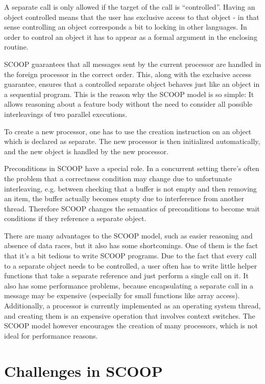 \documentclass[a4paper,10pt]{article}
\begin{document}
A separate call is only allowed if the target of the call is ``controlled''.
Having an object controlled means that the user has exclusive access to that object - in that sense controlling an object corresponds a bit to locking in other languages.
In order to control an object it has to appear as a formal argument in the enclosing routine.

SCOOP guarantees that all messages sent by the current processor are handled in the foreign processor in the correct order.
This, along with the exclusive access guarantee, ensures that a controlled separate object behaves just like an object in a sequential program.
This is the reason why the SCOOP model is so simple: 
It allows reasoning about a feature body without the need to consider all possible interleavings of two parallel executions.

To create a new processor, one has to use the creation instruction on an object which is declared as separate.
The new processor is then initialized automatically, and the new object is handled by the new processor.

Preconditions in SCOOP have a special role.
In a concurrent setting there's often the problem that a correctness condition may change due to unfortunate interleaving, 
e.g. between checking that a buffer is not empty and then removing an item, the buffer actually becomes empty due to interference from another thread.
Therefore SCOOP changes the semantics of preconditions to become wait conditions if they reference a separate object.

There are many advantages to the SCOOP model, such as easier reasoning and absence of data races, but it also has some shortcomings.
One of them is the fact that it's a bit tedious to write SCOOP programs.
Due to the fact that every call to a separate object needs to be controlled, a user often has to write little helper functions that take a separate reference and just perform a single call on it.
It also has some performance problems, because encapsulating a separate call in a message may be expensive (especially for small functions like array access).
Additionally, a processor is currently implemented as an operating system thread, and creating them is an expensive operation that involves context switches.
The SCOOP model however encourages the creation of many processors, which is not ideal for performance reasons.

\section{Challenges in SCOOP}
\label{sec:scoop-challenges}
\end{document}
